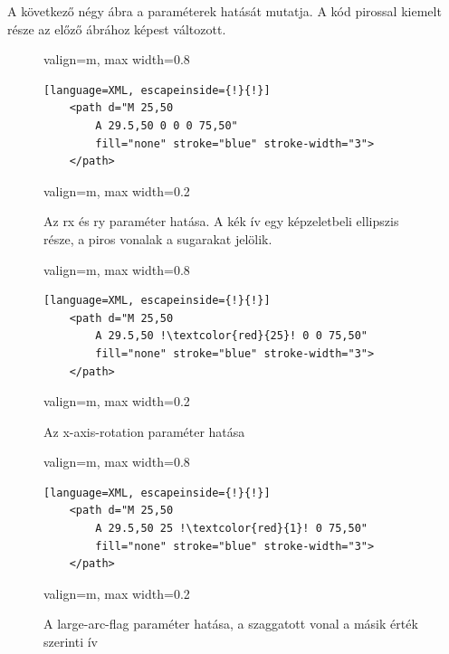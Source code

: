 A következő négy ábra a paraméterek hatását mutatja. A kód pirossal kiemelt része az előző ábrához képest változott.

\begin{figure}[H]
    \centering
    \begin{adjustbox}{valign=m, max width=0.8\textwidth}
        \begin{lstlisting}[language=XML, escapeinside={!}{!}]
    <path d="M 25,50
        A 29.5,50 0 0 0 75,50"
        fill="none" stroke="blue" stroke-width="3">
    </path>
        \end{lstlisting}
    \end{adjustbox}
    \hfill
    \begin{adjustbox}{valign=m, max width=0.2\textwidth}
        
    \end{adjustbox}
    \caption{Az rx és ry paraméter hatása. A kék ív egy képzeletbeli ellipszis része, a piros vonalak a sugarakat jelölik.}
    \label{fig:example_arc_radi}
\end{figure}

\begin{figure}[H]
    \centering
    \begin{adjustbox}{valign=m, max width=0.8\textwidth}
        \begin{lstlisting}[language=XML, escapeinside={!}{!}]
    <path d="M 25,50
        A 29.5,50 !\textcolor{red}{25}! 0 0 75,50"
        fill="none" stroke="blue" stroke-width="3">
    </path>
        \end{lstlisting}
    \end{adjustbox}
    \hfill
    \begin{adjustbox}{valign=m, max width=0.2\textwidth}
        
    \end{adjustbox}
    \caption{Az x-axis-rotation paraméter hatása}
    \label{fig:example_arc_rot}
\end{figure}

\begin{figure}[H]
    \centering
    \begin{adjustbox}{valign=m, max width=0.8\textwidth}
        \begin{lstlisting}[language=XML, escapeinside={!}{!}]
    <path d="M 25,50
        A 29.5,50 25 !\textcolor{red}{1}! 0 75,50"
        fill="none" stroke="blue" stroke-width="3">
    </path>
        \end{lstlisting}
    \end{adjustbox}
    \hfill
    \begin{adjustbox}{valign=m, max width=0.2\textwidth}
        
    \end{adjustbox}
    \caption{A large-arc-flag paraméter hatása, a szaggatott vonal a másik érték szerinti ív}
    \label{fig:example_arc_large}
\end{figure}

